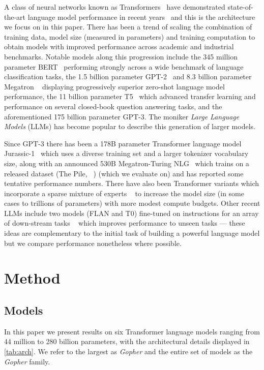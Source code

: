 \documentclass[11pt, a4paper, logo, internal, copyright, nonumbering]{deepmind}
\newcommand{\gopher}{\textit{Gopher}\xspace}
\begin{document}
A class of neural networks known as Transformers~\citep{vaswani2017attention} have demonstrated state-of-the-art language model performance in recent years~\citep{dai2019transformer, radford2018improving, radford2019language} and this is the architecture we focus on in this paper. There has been a trend of scaling the combination of training data, model size (measured in parameters) and training computation to obtain models with improved performance across academic and industrial benchmarks. Notable models along this progression include the 345 million parameter BERT~\citep{devlin2019bert} performing strongly across a wide benchmark of language classification tasks, the 1.5 billion parameter GPT-2~\citep{radford2018improving} and 8.3 billion parameter Megatron ~\citep{shoeybi2019megatron} displaying progressively superior zero-shot language model performance, the 11 billion parameter T5~\citep{raffel2019exploring} which advanced transfer learning and performance on several closed-book question answering tasks, and the aforementioned 175 billion parameter GPT-3. The moniker \textit{Large Language Models} (LLMs) has become popular to describe this generation of larger models.

Since GPT-3 there has been a 178B parameter Transformer language model Jurassic-1~\citep{jurassic} which uses a diverse training set and a larger tokenizer vocabulary size, along with an announced 530B Megatron-Turing NLG~\citep{Megatron-Turing} which trains on a released dataset (The Pile, ~\citet{pile}) (which we evaluate on) and has reported some tentative performance numbers.
There have also been Transformer variants which incorporate a sparse mixture of experts ~\citep{fedus2021switch, roller2021hash} to increase the model size (in some cases to trillions of parameters) with more modest compute budgets. 
Other recent LLMs include two models (FLAN and T0) fine-tuned on instructions for an array of down-stream tasks ~\citep{sanh2021multitask, wei2021finetuned} which improves performance to unseen tasks --- these ideas are complementary to the initial task of building a powerful language model but we compare performance nonetheless where possible.


\section{Method}
\label{sec:method}

\subsection{Models}
\label{method:models}
In this paper we present results on six Transformer language models ranging from 44 million to 280 billion parameters, with the architectural details displayed in \autoref{tab:arch}. We refer to the largest as \gopher and the entire set of models as the \gopher family.
\end{document}
